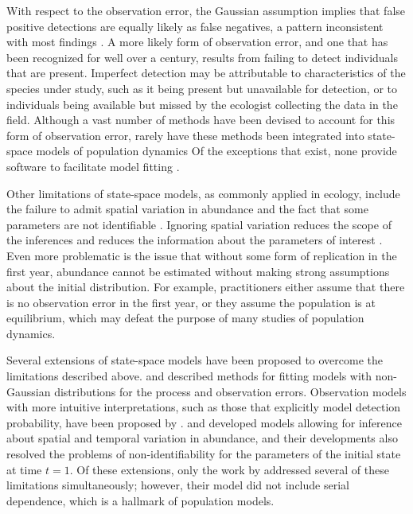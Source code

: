 \documentclass[12pt,english]{article}
\begin{document}
\begin{spacing}{1.9}
\begin{flushleft}
With respect to the observation error, the Gaussian assumption
implies that false positive detections are
equally likely as false negatives, a pattern inconsistent with most
findings \citep{miller_etal:2011}. 
A more likely form of observation error, and one that has been recognized for well
over a century, results from failing to detect individuals that are
present. Imperfect detection may be attributable to
characteristics of the species under study, such as it being present but unavailable for detection,
or to individuals being available but missed by the ecologist collecting the data in the field.
Although a vast number of methods have been devised to account for %
this form of observation error, rarely have these methods been
integrated into state-space models of population dynamics 
Of the exceptions that exist, none provide software to facilitate model fitting 
\citep{buckland_etal:2004}.

Other limitations of state-space models, as commonly applied in ecology,
include the failure to admit spatial variation in abundance and
the fact that some parameters are not identifiable
\citep{polansky_etal:2009}. 
Ignoring spatial variation reduces the scope of the
inferences and reduces the information about the parameters of interest \citep{dennis_etal:2010}.
Even more problematic is the issue that without some form of replication in the first year, 
abundance cannot be estimated without making strong assumptions about 
the initial distribution. 
For example, practitioners either assume that there is no
observation error in the first year, or they assume the population is
at equilibrium, which may defeat the purpose of many studies of
population dynamics. 

Several extensions of state-space models have been proposed to
overcome the limitations described above. \citet{devalpine_hastings:2002} and
\citet{brooks_etal:2004} described methods for fitting models with non-Gaussian
distributions for the process and observation errors. Observation models with
more intuitive interpretations, such as those that explicitly model
detection probability, have been proposed by 
\citet{kery_etal:2009}. \citet{lele_etal:1998} and 
\citet{kery_etal:2009} developed models allowing for inference about
spatial and temporal variation in abundance, and their developments
also resolved the problems of non-identifiability for the parameters
of the initial state at time $t=1$. Of these extensions, only
the work by \citet{kery_etal:2009} addressed several of these limitations
simultaneously; however, their model did not include serial
dependence, which is a hallmark of population models. 


\end{flushleft}
\end{spacing}
\end{document}
